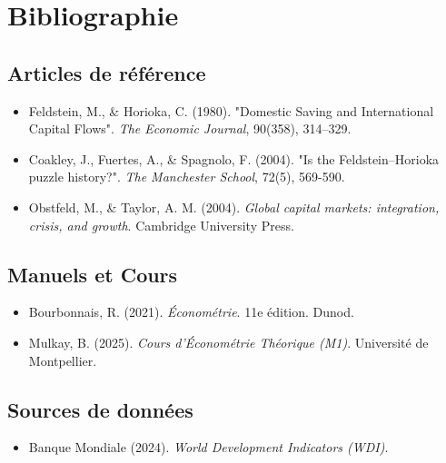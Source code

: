 \documentclass[12pt, a4paper]{article}
\begin{document}
\newpage
{}
\section*{Bibliographie}

\subsection*{Articles de référence}
\begin{itemize}
    \item Feldstein, M., \& Horioka, C. (1980). "Domestic Saving and International Capital Flows". \textit{The Economic Journal}, 90(358), 314–329.
    \item Coakley, J., Fuertes, A., \& Spagnolo, F. (2004). "Is the Feldstein–Horioka puzzle history?". \textit{The Manchester School}, 72(5), 569-590.
    \item Obstfeld, M., \& Taylor, A. M. (2004). \textit{Global capital markets: integration, crisis, and growth}. Cambridge University Press.
\end{itemize}

\subsection*{Manuels et Cours}
\begin{itemize}
    \item Bourbonnais, R. (2021). \textit{Économétrie}. 11e édition. Dunod.
    \item Mulkay, B. (2025). \textit{Cours d'Économétrie Théorique (M1)}. Université de Montpellier.
\end{itemize}

\subsection*{Sources de données}
\begin{itemize}
    \item Banque Mondiale (2024). \textit{World Development Indicators (WDI)}.
\end{itemize}
\end{document}
